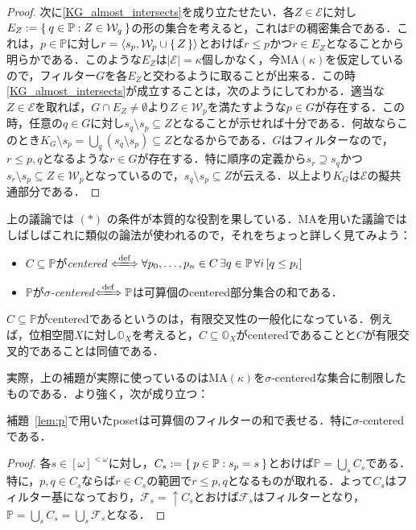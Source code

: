 \documentclass[a4j]{bxjsarticle}
\newcommand{\MA}{\mathrm{MA}}
\theoremstyle{definition}
\begin{document}
\begin{proof}
 次に\ref{KG_almost_intersects}を成り立たせたい．各$Z \in \mathcal{E}$に対し$E_Z \mathrel{:=} \Set{ q \in \mathbb{P} : Z \in \mathcal{W}_q}$の形の集合を考えると，これは$\mathbb{P}$の稠密集合である．これは，$p \in \mathbb{P}$に対し$r = \braket{s_p, \mathcal{W}_p \cup \set{Z}}$とおけば$r \leq p$かつ$r \in E_Z$となることから明らかである．このような$E_Z$は$|\mathcal{E}| = \kappa$個しかなく，今$\MA(\kappa)$を仮定しているので，フィルター$G$を各$E_Z$と交わるように取ることが出来る．この時\ref{KG_almost_intersects}が成立することは，次のようにしてわかる．適当な$Z \in \mathcal{E}$を取れば，$G \cap E_Z \neq \emptyset$より$Z \in \mathcal{W}_p$を満たすような$p \in G$が存在する．この時，任意の$q \in G$に対し$s_q \setminus s_p \subseteq Z$となることが示せれば十分である．何故ならこのとき$K_G \setminus s_p = \bigcup_q (s_q \setminus s_p) \subseteq Z$となるからである．$G$はフィルターなので，$r \leq p, q$となるような$r \in G$が存在する．特に順序の定義から$s_r \supseteq s_q$かつ$s_r \setminus s_p \subseteq Z \in \mathcal{W}_p$となっているので，$s_q \setminus s_p \subseteq Z$が云える．以上より$K_G$は$\mathcal{E}$の擬共通部分である．\mbox{}
\end{proof}

上の議論では $(*)$ の条件が本質的な役割を果している．$\MA$を用いた議論ではしばしばこれに類似の論法が使われるので，それをちょっと詳しく見てみよう：

\begin{definition}
 \begin{itemize}
  \item $C \subseteq \mathbb{P}$が\textit{centered} $\defs \forall p_0, \dots, p_n \in C\, \exists q \in \mathbb{P}\, \forall i\, [q \leq p_i]$
  \item $\mathbb{P}$が\textit{$\sigma$-centered}$\defs \mathbb{P}$は可算個のcentered部分集合の和である．
 \end{itemize}
\end{definition}
$C \subseteq \mathbb{P}$がcenteredであるというのは，有限交叉性の一般化になっている．例えば，位相空間$X$に対し$\mathbb{O}_X$を考えると，$C \subseteq \mathbb{O}_X$がcenteredであることと$C$が有限交叉的であることは同値である．

実際，上の補題が実際に使っているのは$\MA(\kappa)$を$\sigma$-centeredな集合に制限したものである．より強く，次が成り立つ：

\begin{lemma}
 補題~\ref{lem:p}で用いたposetは可算個のフィルターの和で表せる．特に$\sigma$-centeredである．
\end{lemma}
\begin{proof}
 各$s \in [\omega]^{<\omega}$に対し，$C_s \mathrel{:=} \Set{p \in \mathbb{P} : s_p = s}$とおけば$\mathbb{P} = \bigcup_s C_s$である．特に，$p, q \in C_s$ならば$r \in C_s$の範囲で$r \leq p, q$となるものが取れる．よって$C_s$はフィルター基になっており，$\mathcal{F}_s = \mathop{\uparrow} C_s$とおけば$\mathcal{F}_s$はフィルターとなり，$\mathbb{P} = \bigcup_s C_s = \bigcup_s \mathcal{F}_s$となる．\mbox{}
\end{proof}
\end{document}
